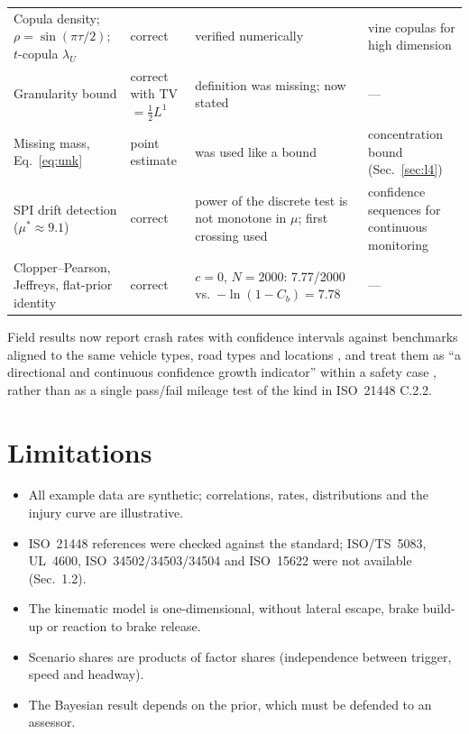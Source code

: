 \documentclass[11pt,a4paper]{article}
\begin{document}
{\begin{longtable}{L{2.6cm}L{1.6cm}L{5.0cm}L{5.4cm}}
Copula density; $\rho=\sin(\pi\tau/2)$; $t$-copula $\lambda_U$ & correct & verified numerically & vine copulas for high dimension \cite[location not verified]{joe2014}\\
Granularity bound & correct with TV $=\tfrac12L^1$ & definition was missing; now stated & ---\\
Missing mass, Eq.~\eqref{eq:unk} & point estimate & was used like a bound & concentration bound \cite[Theorem~1]{berend2013} (Sec.~\ref{sec:l4})\\
SPI drift detection ($\mu^*\approx 9.1$) & correct & power of the discrete test is not monotone in $\mu$; first crossing used & confidence sequences for continuous monitoring \cite{ramdas2023}\\
Clopper--Pearson, Jeffreys, flat-prior identity & correct & $c=0$, $N=2000$: 7.77/2000 vs.\ $-\ln(1-C_b)=7.78$ & ---\\
\bottomrule
\end{longtable}
}

Field results now report crash rates with confidence intervals against benchmarks aligned to the same vehicle types, road types and locations \cite[Abstract]{kusano2025}, and treat them as ``a directional and continuous confidence growth indicator'' within a safety case \cite[Abstract]{kusano2024}, rather than as a single pass/fail mileage test of the kind in ISO~21448 C.2.2.

\section{Limitations}\label{sec:limits}
\begin{itemize}
\item All example data are synthetic; correlations, rates, distributions and the injury curve are illustrative.
\item ISO~21448 references were checked against the standard; ISO/TS~5083, UL~4600, ISO~34502/34503/34504 and ISO~15622 were not available (Sec.~1.2).
\item The kinematic model is one-dimensional, without lateral escape, brake build-up or reaction to brake release.
\item Scenario shares are products of factor shares (independence between trigger, speed and headway).
\item The Bayesian result depends on the prior, which must be defended to an assessor.
\end{itemize}
\end{document}
